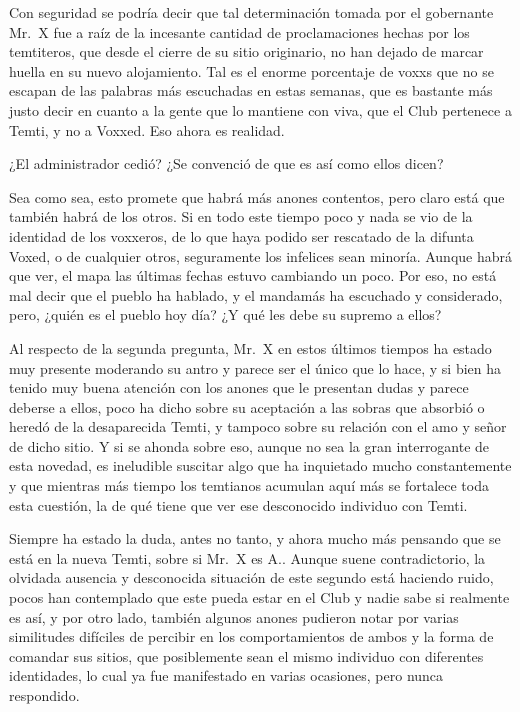 \documentclass[
  spanish,
]{book}
\begin{document}
Con seguridad se podría decir que tal determinación tomada por el gobernante Mr.~X fue a raíz de la incesante cantidad de proclamaciones hechas por los temtiteros, que desde el cierre de su sitio originario, no han dejado de marcar huella en su nuevo alojamiento. Tal es el enorme porcentaje de voxxs que no se escapan de las palabras más escuchadas en estas semanas, que es bastante más justo decir en cuanto a la gente que lo mantiene con viva, que el Club pertenece a Temti, y no a Voxxed. Eso ahora es realidad.

¿El administrador cedió? ¿Se convenció de que es así como ellos dicen?

Sea como sea, esto promete que habrá más anones contentos, pero claro está que también habrá de los otros. Si en todo este tiempo poco y nada se vio de la identidad de los voxxeros, de lo que haya podido ser rescatado de la difunta Voxed, o de cualquier otros, seguramente los infelices sean minoría. Aunque habrá que ver, el mapa las últimas fechas estuvo cambiando un poco. Por eso, no está mal decir que el pueblo ha hablado, y el mandamás ha escuchado y considerado, pero, ¿quién es el pueblo hoy día? ¿Y qué les debe su supremo a ellos?

Al respecto de la segunda pregunta, Mr.~X en estos últimos tiempos ha estado muy presente moderando su antro y parece ser el único que lo hace, y si bien ha tenido muy buena atención con los anones que le presentan dudas y parece deberse a ellos, poco ha dicho sobre su aceptación a las sobras que absorbió o heredó de la desaparecida Temti, y tampoco sobre su relación con el amo y señor de dicho sitio. Y si se ahonda sobre eso, aunque no sea la gran interrogante de esta novedad, es ineludible suscitar algo que ha inquietado mucho constantemente y que mientras más tiempo los temtianos acumulan aquí más se fortalece toda esta cuestión, la de qué tiene que ver ese desconocido individuo con Temti.

Siempre ha estado la duda, antes no tanto, y ahora mucho más pensando que se está en la nueva Temti, sobre si Mr.~X es A.. Aunque suene contradictorio, la olvidada ausencia y desconocida situación de este segundo está haciendo ruido, pocos han contemplado que este pueda estar en el Club y nadie sabe si realmente es así, y por otro lado, también algunos anones pudieron notar por varias similitudes difíciles de percibir en los comportamientos de ambos y la forma de comandar sus sitios, que posiblemente sean el mismo individuo con diferentes identidades, lo cual ya fue manifestado en varias ocasiones, pero nunca respondido.
\end{document}
